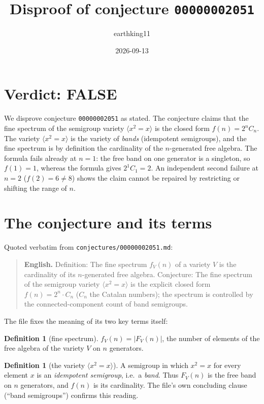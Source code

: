 \documentclass[11pt]{article}
\title{Disproof of conjecture \texttt{00000002051}}
\author{earthking11}
\date{2026-09-13}
\theoremstyle{definition}
\newtheorem{definition}[theorem]{Definition}
\theoremstyle{remark}
\begin{document}
\maketitle

\section*{Verdict: FALSE}

We disprove conjecture \texttt{00000002051} as stated. The conjecture claims that
the fine spectrum of the semigroup variety $\langle x^2 = x\rangle$ is the closed
form $f(n) = 2^n C_n$. The variety $\langle x^2 = x\rangle$ is the variety of
\emph{bands} (idempotent semigroups), and the fine spectrum is by definition the
cardinality of the $n$-generated free algebra. The formula fails already at
$n = 1$: the free band on one generator is a singleton, so $f(1) = 1$, whereas
the formula gives $2^1 C_1 = 2$. An independent second failure at $n = 2$
($f(2) = 6 \ne 8$) shows the claim cannot be repaired by restricting or shifting
the range of $n$.

\section{The conjecture and its terms}

Quoted verbatim from \texttt{conjectures/00000002051.md}:

\begin{quote}
\textbf{English.} Definition: The fine spectrum $f_V(n)$ of a variety $V$ is the
cardinality of its $n$-generated free algebra. Conjecture: The fine spectrum of
the semigroup variety $\langle x^2 = x\rangle$ is the explicit closed form
$f(n) = 2^{n}\cdot C_n$ ($C_n$ the Catalan numbers); the spectrum is controlled
by the connected-component count of band semigroups.
\end{quote}

The file fixes the meaning of its two key terms itself:

\begin{definition}[fine spectrum]
$f_V(n) = |F_V(n)|$, the number of elements of the free algebra of the variety
$V$ on $n$ generators.
\end{definition}

\begin{definition}[the variety $\langle x^2 = x\rangle$]
A semigroup in which $x^2 = x$ for every element $x$ is an \emph{idempotent
semigroup}, i.e.\ a \emph{band}. Thus $F_V(n)$ is the free band on $n$
generators, and $f(n)$ is its cardinality. The file's own concluding clause
(``band semigroups'') confirms this reading.
\end{definition}
\end{document}
